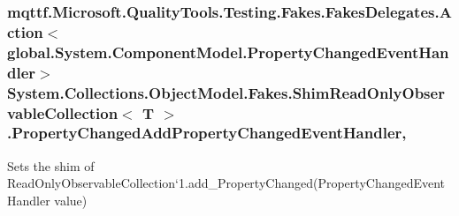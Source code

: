 \hypertarget{class_system_1_1_collections_1_1_object_model_1_1_fakes_1_1_shim_read_only_observable_collection_3_01_t_01_4_a18c13451032bf3fbdbab4b9ea6e48e62}{
\subsubsection[{Property\-Changed\-Add\-Property\-Changed\-Event\-Handler}]{\setlength{\rightskip}{0pt plus 5cm}mqttf.\-Microsoft.\-Quality\-Tools.\-Testing.\-Fakes.\-Fakes\-Delegates.\-Action$<$global.\-System.\-Component\-Model.\-Property\-Changed\-Event\-Handler$>$ System.\-Collections.\-Object\-Model.\-Fakes.\-Shim\-Read\-Only\-Observable\-Collection$<$ T $>$.Property\-Changed\-Add\-Property\-Changed\-Event\-Handler\hspace{0.3cm}{\ttfamily [set]}, {\ttfamily [add]}}}\label{class_system_1_1_collections_1_1_object_model_1_1_fakes_1_1_shim_read_only_observable_collection_3_01_t_01_4_a18c13451032bf3fbdbab4b9ea6e48e62}


Sets the shim of Read\-Only\-Observable\-Collection`1.add\-\_\-\-Property\-Changed(\-Property\-Changed\-Event\-Handler value)


